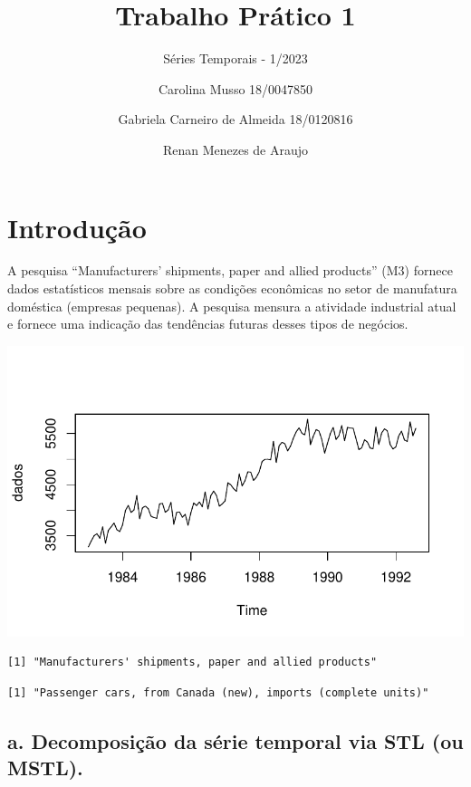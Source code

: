 \documentclass[
  letterpaper,
  DIV=11,
  numbers=noendperiod]{scrartcl}
\title{Trabalho Prático 1}
\subtitle{Séries Temporais - 1/2023}
\author{Carolina Musso 18/0047850 \and Gabriela Carneiro de Almeida
18/0120816 \and Renan Menezes de Araujo}
\date{}
\begin{document}
\maketitle
\ifdefined\Shaded\renewenvironment{Shaded}{\begin{tcolorbox}[sharp corners, enhanced, frame hidden, boxrule=0pt, borderline west={3pt}{0pt}{shadecolor}, interior hidden, breakable]}{\end{tcolorbox}}\fi

\hypertarget{introduuxe7uxe3o}{%
\section{Introdução}\label{introduuxe7uxe3o}}

A pesquisa ``Manufacturers' shipments, paper and allied products'' (M3)
fornece dados estatísticos mensais sobre as condições econômicas no
setor de manufatura doméstica (empresas pequenas). A pesquisa mensura a
atividade industrial atual e fornece uma indicação das tendências
futuras desses tipos de negócios.

\includegraphics{Trabalhao1_ST_grupo5res_files/figure-pdf/unnamed-chunk-2-1.pdf}

\begin{verbatim}
[1] "Manufacturers' shipments, paper and allied products"
\end{verbatim}

\begin{verbatim}
[1] "Passenger cars, from Canada (new), imports (complete units)"
\end{verbatim}

\hypertarget{a.-decomposiuxe7uxe3o-da-suxe9rie-temporal-via-stl-ou-mstl.}{%
\subsection{a. Decomposição da série temporal via STL (ou
MSTL).}\label{a.-decomposiuxe7uxe3o-da-suxe9rie-temporal-via-stl-ou-mstl.}}
\end{document}
